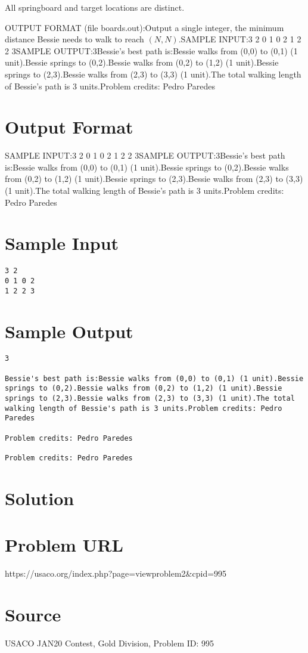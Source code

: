 \documentclass[12pt]{article}
\begin{document}
All springboard and target locations are distinct.

OUTPUT FORMAT (file boards.out):Output a single integer, the minimum distance Bessie needs to walk to reach
$(N,N)$.SAMPLE INPUT:3 2
0 1 0 2
1 2 2 3SAMPLE OUTPUT:3Bessie's best path is:Bessie walks from (0,0) to (0,1) (1 unit).Bessie springs to (0,2).Bessie walks from (0,2) to (1,2) (1 unit).Bessie springs to (2,3).Bessie walks from (2,3) to (3,3) (1 unit).The total walking length of Bessie's path is 3 units.Problem credits: Pedro Paredes

\section*{Output Format}
SAMPLE INPUT:3 2
0 1 0 2
1 2 2 3SAMPLE OUTPUT:3Bessie's best path is:Bessie walks from (0,0) to (0,1) (1 unit).Bessie springs to (0,2).Bessie walks from (0,2) to (1,2) (1 unit).Bessie springs to (2,3).Bessie walks from (2,3) to (3,3) (1 unit).The total walking length of Bessie's path is 3 units.Problem credits: Pedro Paredes

\section*{Sample Input}
\begin{verbatim}
3 2
0 1 0 2
1 2 2 3
\end{verbatim}

\section*{Sample Output}
\begin{verbatim}
3

Bessie's best path is:Bessie walks from (0,0) to (0,1) (1 unit).Bessie springs to (0,2).Bessie walks from (0,2) to (1,2) (1 unit).Bessie springs to (2,3).Bessie walks from (2,3) to (3,3) (1 unit).The total walking length of Bessie's path is 3 units.Problem credits: Pedro Paredes

Problem credits: Pedro Paredes

Problem credits: Pedro Paredes
\end{verbatim}

\section*{Solution}


\section*{Problem URL}
https://usaco.org/index.php?page=viewproblem2&cpid=995

\section*{Source}
USACO JAN20 Contest, Gold Division, Problem ID: 995
\end{document}
